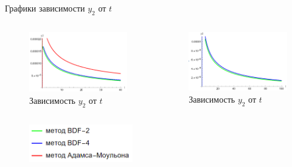 \documentclass[ignoreonframetext,unicode]{beamer}
\begin{document}
\begin{frame}{Графики зависимости $y_2$ от $t$}
	\begin{columns}
		
		\begin{figure}[!htbp]
			\centering
			\includegraphics[width=1\textwidth]{T40-2}%
			\caption{Зависимость $y_2$ от $t$}
			\vspace*{-2mm}
			\label{T40-2}
		\end{figure}
		
		\begin{figure}[!htbp]
			\centering
			\includegraphics[width=1\textwidth]{T100-2}%
			\caption{Зависимость $y_2$ от $t$}
			\vspace*{-2mm}
			\label{T100-2}
		\end{figure}
	\end{columns}

	\begin{figure}[!htbp]
	\centering
	\includegraphics[width=0.4\textwidth]{graph-legend}
	\end{figure}
\end{frame}
\end{document}
